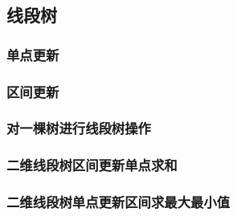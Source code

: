 \subsection{线段树}
\subsubsection{单点更新}


\subsubsection{区间更新}


\subsubsection{对一棵树进行线段树操作}


\subsubsection{二维线段树区间更新单点求和}


\subsubsection{二维线段树单点更新区间求最大最小值}




